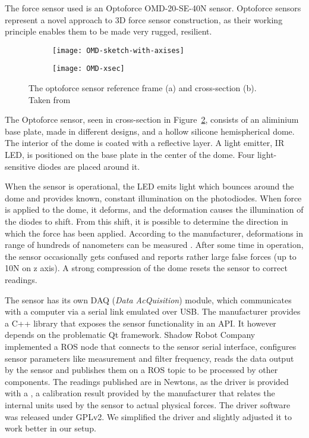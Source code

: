 \documentclass[buriama8_dp.tex]{subfiles}
\begin{document}
The force sensor used is an Optoforce OMD-20-SE-40N sensor. Optoforce sensors represent a novel approach to 3D force sensor construction, as their working principle enables them to be made very rugged, resilient.

\begin{figure}[ht]
  \begin{subfigure}[t]{0.4\textwidth}
    \texttt{[image: OMD-sketch-with-axises]}
    \caption{}
    \label{fig:omd_geom}
  \end{subfigure}
  \begin{subfigure}[t]{0.4\textwidth}
    \texttt{[image: OMD-xsec]}
    \caption{}
    \label{fig:omd_xsec}
  \end{subfigure}

  \caption[Optoforce sensor]{The optoforce sensor reference frame (a) and cross-section (b). Taken from \cite{opto_whitep}}
  \label{fig:decomps}
\end{figure}

The Optoforce sensor, seen in cross-section in Figure~\ref{fig:omd_xsec}, consists of an aliminium base plate, made in different designs, and a hollow silicone hemispherical dome. The interior of the dome is coated with a reflective layer. A light emitter, IR LED, is positioned on the base plate in the center of the dome. Four light-sensitive diodes are placed around it.

When the sensor is operational, the LED emits light which bounces around the dome and provides known, constant illumination on the photodiodes. When force is applied to the dome, it deforms, and the deformation causes the illumination of the diodes to shift. From this shift, it is possible to determine the direction in which the force has been applied. According to the manufacturer, deformations in range of hundreds of nanometers can be measured \cite{opto_whitep}. After some time in operation, the sensor occasionally gets confused and reports rather large false forces (up to 10N on z axis). A strong compression of the dome resets the sensor to correct readings.

The sensor has its own DAQ (\emph{Data AcQuisition}) module, which communicates with a computer via a serial link emulated over USB. The manufacturer provides a C++ library that exposes the sensor functionality in an API. It however depends on the problematic Qt framework. Shadow Robot Company \cite{opto_driver}  implemented a ROS node that connects to the sensor serial interface, configures sensor parameters like measurement and filter frequency, reads the data output by the sensor and publishes them on a ROS topic to be processed by other components. The readings published are in Newtons, as the driver is provided with a , a calibration result provided by the manufacturer that relates the internal units used by the sensor to actual physical forces. The driver software was released under GPLv2. We simplified the driver and slightly adjusted it to work better in our setup.
\end{document}
